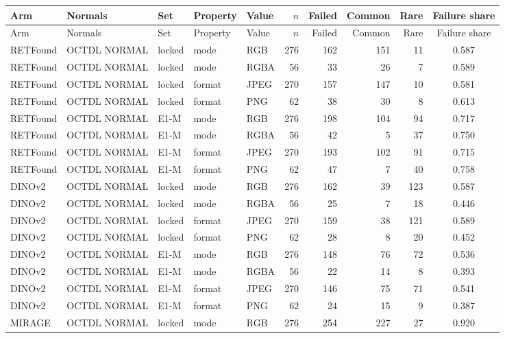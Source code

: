 \begin{longtable}{@{}lllllrrrrc@{}}
\toprule
Arm & Normals & Set & Property & Value & $n$ & Failed & Common & Rare & Failure share \\
\midrule
\endfirsthead
\toprule
Arm & Normals & Set & Property & Value & $n$ & Failed & Common & Rare & Failure share \\
\midrule
\endhead
\bottomrule
\endfoot
\bottomrule
\endlastfoot
RETFound & OCTDL NORMAL & locked & mode & RGB & 276 & 162 & 151 & 11 & 0.587 \\
RETFound & OCTDL NORMAL & locked & mode & RGBA & 56 & 33 & 26 & 7 & 0.589 \\
RETFound & OCTDL NORMAL & locked & format & JPEG & 270 & 157 & 147 & 10 & 0.581 \\
RETFound & OCTDL NORMAL & locked & format & PNG & 62 & 38 & 30 & 8 & 0.613 \\
RETFound & OCTDL NORMAL & E1-M & mode & RGB & 276 & 198 & 104 & 94 & 0.717 \\
RETFound & OCTDL NORMAL & E1-M & mode & RGBA & 56 & 42 & 5 & 37 & 0.750 \\
RETFound & OCTDL NORMAL & E1-M & format & JPEG & 270 & 193 & 102 & 91 & 0.715 \\
RETFound & OCTDL NORMAL & E1-M & format & PNG & 62 & 47 & 7 & 40 & 0.758 \\
DINOv2 & OCTDL NORMAL & locked & mode & RGB & 276 & 162 & 39 & 123 & 0.587 \\
DINOv2 & OCTDL NORMAL & locked & mode & RGBA & 56 & 25 & 7 & 18 & 0.446 \\
DINOv2 & OCTDL NORMAL & locked & format & JPEG & 270 & 159 & 38 & 121 & 0.589 \\
DINOv2 & OCTDL NORMAL & locked & format & PNG & 62 & 28 & 8 & 20 & 0.452 \\
DINOv2 & OCTDL NORMAL & E1-M & mode & RGB & 276 & 148 & 76 & 72 & 0.536 \\
DINOv2 & OCTDL NORMAL & E1-M & mode & RGBA & 56 & 22 & 14 & 8 & 0.393 \\
DINOv2 & OCTDL NORMAL & E1-M & format & JPEG & 270 & 146 & 75 & 71 & 0.541 \\
DINOv2 & OCTDL NORMAL & E1-M & format & PNG & 62 & 24 & 15 & 9 & 0.387 \\
MIRAGE & OCTDL NORMAL & locked & mode & RGB & 276 & 254 & 227 & 27 & 0.920 \\

\end{longtable}
